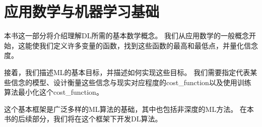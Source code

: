 \part{应用数学与机器学习基础}
\label{part:applied_math_and_machine_learning_basics}

\newpage

本书这一部分将介绍理解\gls{DL}所需的基本数学概念。
我们从应用数学的一般概念开始，这能使我们定义许多变量的函数，找到这些函数的最高和最低点，并量化信念度。

接着，我们描述\gls{ML}的基本目标，并描述如何实现这些目标。
我们需要指定代表某些信念的模型、设计衡量这些信念与现实对应程度的\gls{cost_function}以及使用训练算法最小化这个\gls{cost_function}。


这个基本框架是广泛多样的\gls{ML}算法的基础，其中也包括非深度的\gls{ML}方法。
在本书的后续部分，我们将在这个框架下开发\gls{DL}算法。






